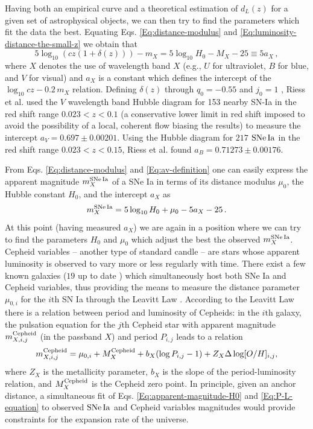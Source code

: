 Having both an empirical curve and a theoretical estimation of $d_L(z)$ for a given set of astrophysical objects, we can then try to find the parameters which fit the data the best. Equating Eqs. \eqref{Eq:distance-modulus} and \eqref{Eq:luminosity-distance-the-small-z} we obtain that
\begin{equation}\label{Eq:av-definition}
5 \log_{10} ( c z ( 1+\delta(z) )) - m_X = 5 \log_{10} H_0 - M_X - 25 \equiv 5 a_X \, ,
\end{equation}
where $X$ denotes the use of wavelength band $X$ (e.g., $U$ for ultraviolet, $B$ for blue, and $V$ for visual) and $a_X$ is a constant which defines the intercept of the $\log_{10} cz - 0.2\, m_X$ relation. Defining $\delta(z)$ through $q_0 = -0.55$ and $j_0 = 1$ \cite{Riess:2006fw}, Riess et al. \cite{Riess:2011yx} used the $V$ wavelength band Hubble diagram for 153 nearby SN-Ia in the red shift range $0.023 < z < 0.1$ (a conservative lower limit in red shift imposed to avoid the possibility of a local, coherent flow biasing the results)
to measure the intercept $a_V = 0.697 \pm 0.00201$. Using the Hubble diagram for $217$ $\mathrm{SNe\,Ia}$ in the red shift range $0.023 < z < 0.15$, Riess et al. \cite{Riess:2016jrr} found $a_B = 0.71273 \pm 0.00176$.

From Eqs. \eqref{Eq:distance-modulus} and \eqref{Eq:av-definition} one can easily express the apparent magnitude $m_X^{\mathrm{SNe\,Ia}}$ of a SNe Ia in terms of its distance modulus $\mu_0$, the Hubble constant $H_0$, and the intercept $a_X$ as
\begin{equation}
m_X^{\mathrm{SNe\,Ia}} =  5 \log_{10} H_0 + \mu_0 - 5 a_X - 25 \, . \label{Eq:apparent-magnitude-H0}
\end{equation}
At this point (having measured $a_X$) we are again in a position where we can try to find the parameters $H_0$ and $\mu_0$ which adjust the best the observed $m^{\mathrm{SNe\,Ia}}_X$. Cepheid variables -- another type of standard candle -- are stars whose apparent luminosity is observed to vary more or less regularly with time. There exist a few known galaxies ($19$ up to date \cite{Riess:2016jrr}) which simultaneously host both SNe Ia and Cepheid variables, thus providing the means to measure the distance parameter $\mu_{0,i}$ for the $i\mathrm{th}$ SN Ia through the Leavitt Law \cite{1912HarCi.173....1L}. According to the Leavitt Law there is a relation between period and luminosity of Cepheids: in the $i\mathrm{th}$ galaxy, the pulsation equation for the $j\mathrm{th}$ Cepheid star with apparent magnitude $m^{\mathrm{Cepheid}}_{X,i,j}$ (in the passband $X$) and period $P_{i,j}$ leads to a relation 
\begin{equation}\label{Eq:P-L-equation}
m^{\mathrm{Cepheid}}_{X,i,j} = \mu_{0,i} + M^{\mathrm{Cepheid}}_X + b_X (\log P_{i,j}-1) + Z_X \Delta \log[O/H]_{i,j},
\end{equation}
where $Z_X$ is the metallicity parameter, $b_X$ is the slope of the period-luminosity relation, and $M^{\mathrm{Cepheid}}_X$ is the Cepheid zero point. In principle, given an anchor distance, a simultaneous fit of Eqs. \eqref{Eq:apparent-magnitude-H0} and \eqref{Eq:P-L-equation} to observed $\mathrm{SNe\,Ia}$ and Cepheid variables magnitudes would provide constraints for the expansion rate of the universe. 

